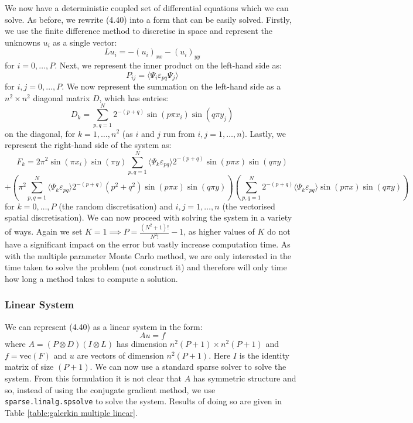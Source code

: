 \documentclass[11pt]{article}
\numberwithin{equation}{section}
\begin{document}
We now have a deterministic coupled set of differential equations which we can solve. As before, we rewrite (4.40) into a form that can be easily solved. Firstly, we use the finite difference method to discretise in space and represent the unknowns $u_i$ as a single vector:
\begin{equation}
Lu_i = - (u_i)_{xx} - (u_i)_{yy}
\end{equation}
for $i=0,\dots,P$. Next, we represent the inner product on the left-hand side as:
\begin{equation}
P_{ij} = \langle \Psi_i \varepsilon_{pq} \Psi_j \rangle
\end{equation}
for $i,j=0,\dots,P$. We now represent the summation on the left-hand side as a $n^2 \times n^2$ diagonal matrix $D$, which has entries:
\begin{equation}
D_k = \sum_{p,q=1}^N 2^{-(p+q)} \sin(p \pi x_i) \sin(q \pi y_j)
\end{equation}
on the diagonal, for $k=1,\dots,n^2$ (as $i$ and $j$ run from $i,j=1,\dots,n$). Lastly, we represent the right-hand side of the system as:
\begin{equation}
F_k = 2 \pi^2 \sin(\pi x_i) \sin(\pi y) \sum_{p,q=1}^N \langle \Psi_k \varepsilon_{pq} \rangle 2^{-(p+q)} \sin(p \pi x)\sin(q \pi y) \nonumber
\end{equation}
\begin{equation}
+ \left(\pi^2 \sum_{p,q=1}^N \langle \Psi_k \varepsilon_{pq} \rangle 2^{-(p+q)} (p^2 + q^2) \sin(p \pi x)\sin(q \pi y) \right) \left(\sum_{p,q=1}^N 2^{-(p+q)} \langle \Psi_k \varepsilon_{pq} \rangle \sin(p \pi x)\sin(q \pi y) \right)
\end{equation}
for $k=0,\dots,P$ (the random discretisation) and $i,j=1,\dots,n$ (the vectorised spatial discretisation). We can now proceed with solving the system in a variety of ways. Again we set $K=1 \implies P = \frac{(N^2 + 1)!}{N^2 !} - 1$, as higher values of $K$ do not have a significant impact on the error but vastly increase computation time. As with the multiple parameter Monte Carlo method, we are only interested in the time taken to solve the problem (not construct it) and therefore will only time how long a method takes to compute a solution.

\subsubsection*{Linear System}
We can represent (4.40) as a linear system in the form:
\begin{equation}
Au = f
\end{equation}
where $A=\left( P \otimes D \right) \left( I \otimes L \right)$ has dimension $n^2(P+1) \times n^2(P+1)$ and $f = \text{vec}(F)$ and $u$ are vectors of dimension $n^2(P+1)$. Here $I$ is the identity matrix of size $(P+1)$. We can now use a standard sparse solver to solve the system. From this formulation it is not clear that $A$ has symmetric structure and so, instead of using the conjugate gradient method, we use \texttt{sparse.linalg.spsolve} to solve the system. Results of doing so are given in Table \ref{table:galerkin multiple linear}.
\end{document}
